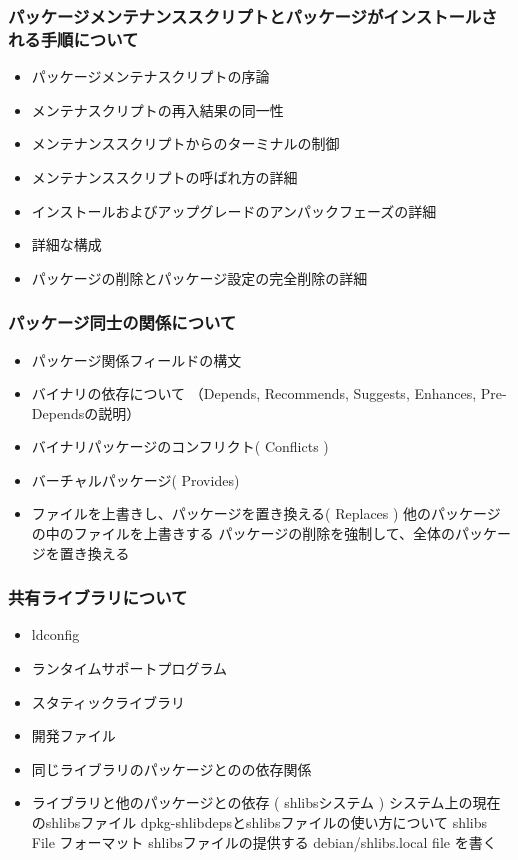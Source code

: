 \documentclass[mingoth,a4paper]{jsarticle}
\begin{document}
    \subsubsection{パッケージメンテナンススクリプトとパッケージがインストールされる手順について}
\begin{itemize}
        \item パッケージメンテナスクリプトの序論
        \item メンテナスクリプトの再入結果の同一性
        \item メンテナンススクリプトからのターミナルの制御
        \item メンテナンススクリプトの呼ばれ方の詳細
        \item インストールおよびアップグレードのアンパックフェーズの詳細
        \item 詳細な構成
        \item パッケージの削除とパッケージ設定の完全削除の詳細
\end{itemize}

    \subsubsection{パッケージ同士の関係について}
\begin{itemize}
        \item パッケージ関係フィールドの構文
        \item バイナリの依存について
            （Depends, Recommends, Suggests, Enhances, Pre-Dependsの説明）
        \item バイナリパッケージのコンフリクト( Conflicts )
        \item バーチャルパッケージ( Provides)
        \item ファイルを上書きし、パッケージを置き換える( Replaces )
            他のパッケージの中のファイルを上書きする
            パッケージの削除を強制して、全体のパッケージを置き換える
\end{itemize}

    \subsubsection{共有ライブラリについて}
\begin{itemize}
        \item ldconfig
        \item ランタイムサポートプログラム
        \item スタティックライブラリ
        \item 開発ファイル
        \item 同じライブラリのパッケージとのの依存関係
        \item ライブラリと他のパッケージとの依存 ( shlibsシステム )
            システム上の現在のshlibsファイル
            dpkg-shlibdepsとshlibsファイルの使い方について
            shlibs File フォーマット
            shlibsファイルの提供する
            debian/shlibs.local file を書く
\end{itemize}
\end{document}
